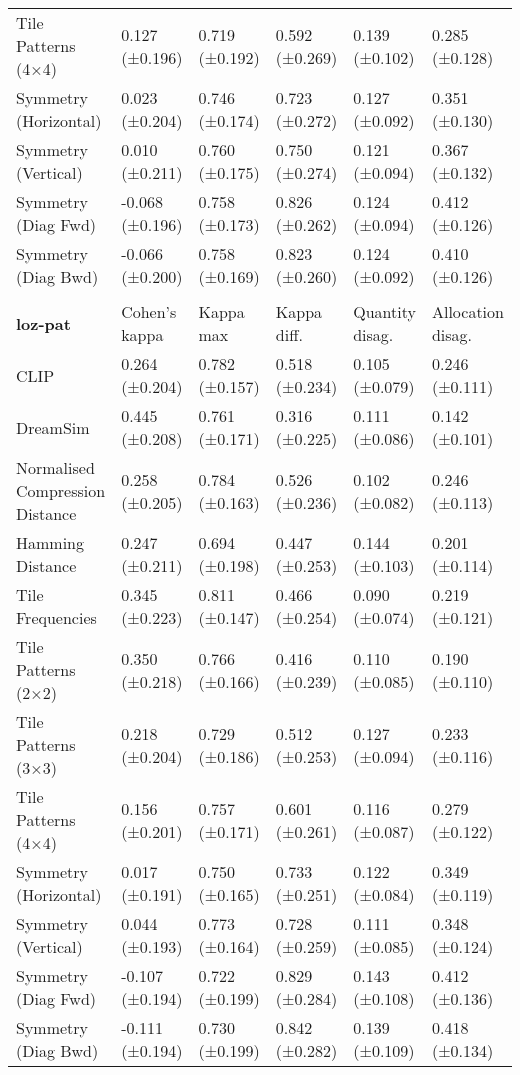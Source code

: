 \begin{tabular}{l|lllll}
Tile Patterns (4×4) & 0.127 (±0.196) & 0.719 (±0.192) & 0.592 (±0.269) & 0.139 (±0.102) & 0.285 (±0.128) \\
Symmetry (Horizontal) & 0.023 (±0.204) & 0.746 (±0.174) & 0.723 (±0.272) & 0.127 (±0.092) & 0.351 (±0.130) \\
Symmetry (Vertical) & 0.010 (±0.211) & 0.760 (±0.175) & 0.750 (±0.274) & 0.121 (±0.094) & 0.367 (±0.132) \\
Symmetry (Diag Fwd) & -0.068 (±0.196) & 0.758 (±0.173) & 0.826 (±0.262) & 0.124 (±0.094) & 0.412 (±0.126) \\
Symmetry (Diag Bwd) & -0.066 (±0.200) & 0.758 (±0.169) & 0.823 (±0.260) & 0.124 (±0.092) & 0.410 (±0.126) \\
 & & & & & \\
\textbf{loz-pat}    & Cohen's kappa    & Kappa max        & Kappa diff.      & Quantity disag.  & Allocation disag. \\ \hline
CLIP                & 0.264 (±0.204) & 0.782 (±0.157) & 0.518 (±0.234) & 0.105 (±0.079) & 0.246 (±0.111) \\
DreamSim            & 0.445 (±0.208) & 0.761 (±0.171) & 0.316 (±0.225) & 0.111 (±0.086) & 0.142 (±0.101) \\
Normalised Compression Distance & 0.258 (±0.205) & 0.784 (±0.163) & 0.526 (±0.236) & 0.102 (±0.082) & 0.246 (±0.113) \\
Hamming Distance    & 0.247 (±0.211) & 0.694 (±0.198) & 0.447 (±0.253) & 0.144 (±0.103) & 0.201 (±0.114) \\
Tile Frequencies    & 0.345 (±0.223) & 0.811 (±0.147) & 0.466 (±0.254) & 0.090 (±0.074) & 0.219 (±0.121) \\
Tile Patterns (2×2) & 0.350 (±0.218) & 0.766 (±0.166) & 0.416 (±0.239) & 0.110 (±0.085) & 0.190 (±0.110) \\
Tile Patterns (3×3) & 0.218 (±0.204) & 0.729 (±0.186) & 0.512 (±0.253) & 0.127 (±0.094) & 0.233 (±0.116) \\
Tile Patterns (4×4) & 0.156 (±0.201) & 0.757 (±0.171) & 0.601 (±0.261) & 0.116 (±0.087) & 0.279 (±0.122) \\
Symmetry (Horizontal) & 0.017 (±0.191) & 0.750 (±0.165) & 0.733 (±0.251) & 0.122 (±0.084) & 0.349 (±0.119) \\
Symmetry (Vertical) & 0.044 (±0.193) & 0.773 (±0.164) & 0.728 (±0.259) & 0.111 (±0.085) & 0.348 (±0.124) \\
Symmetry (Diag Fwd) & -0.107 (±0.194) & 0.722 (±0.199) & 0.829 (±0.284) & 0.143 (±0.108) & 0.412 (±0.136) \\
Symmetry (Diag Bwd) & -0.111 (±0.194) & 0.730 (±0.199) & 0.842 (±0.282) & 0.139 (±0.109) & 0.418 (±0.134) \\
\end{tabular}
